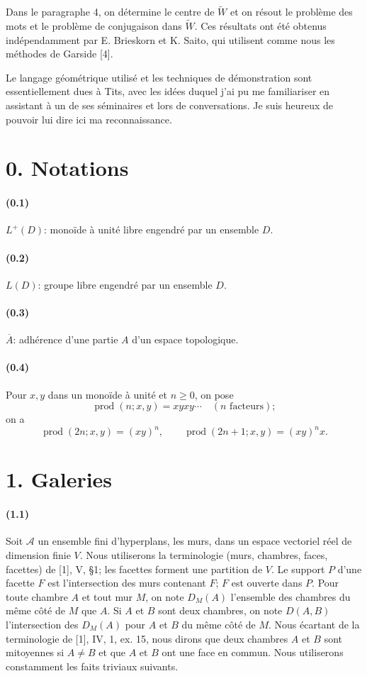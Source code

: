 \documentclass[10pt]{article}
\newcommand{\prodalt}{\operatorname{prod}}
\newcommand{\cl}[1]{\overline{#1}}
\newcommand{\mcA}{\mathcal A}
\begin{document}
Dans le paragraphe 4, on détermine le centre de $\widetilde W$ et on résout le problème des mots et le problème de conjugaison dans $\widetilde W$. Ces résultats ont été obtenus indépendamment par E. Brieskorn et K. Saito, qui utilisent comme nous les méthodes de Garside [4].

Le langage géométrique utilisé et les techniques de démonstration sont essentiellement dues à Tits, avec les idées duquel j'ai pu me familiariser en assistant à un de ses séminaires et lors de conversations. Je suis heureux de pouvoir lui dire ici ma reconnaissance.

\section*{0. Notations}

\paragraph{(0.1)} $L^+(D)$: monoïde à unité libre engendré par un ensemble $D$.

\paragraph{(0.2)} $L(D)$: groupe libre engendré par un ensemble $D$.

\paragraph{(0.3)} $\cl A$: adhérence d'une partie $A$ d'un espace topologique.

\paragraph{(0.4)} Pour $x,y$ dans un monoïde à unité et $n\ge0$, on pose
\[
\prodalt(n;x,y)=xyxy\cdots\quad (n\text{ facteurs});
\]
on a
\[
\prodalt(2n;x,y)=(xy)^n,\qquad
\prodalt(2n+1;x,y)=(xy)^nx.
\]

\section*{1. Galeries}

\paragraph{(1.1)} Soit $\mcA$ un ensemble fini d'hyperplans, les murs, dans un espace vectoriel réel de dimension finie $V$. Nous utiliserons la terminologie (murs, chambres, faces, facettes) de [1], V, §1; les facettes forment une partition de $V$. Le support $P$ d'une facette $F$ est l'intersection des murs contenant $F$; $F$ est ouverte dans $P$. Pour toute chambre $A$ et tout mur $M$, on note $D_M(A)$ l'ensemble des chambres du même côté de $M$ que $A$. Si $A$ et $B$ sont deux chambres, on note $D(A,B)$ l'intersection des $D_M(A)$ pour $A$ et $B$ du même côté de $M$. Nous écartant de la terminologie de [1], IV, 1, ex. 15, nous dirons que deux chambres $A$ et $B$ sont mitoyennes si $A\ne B$ et que $A$ et $B$ ont une face en commun. Nous utiliserons constamment les faits triviaux suivants.
\end{document}
